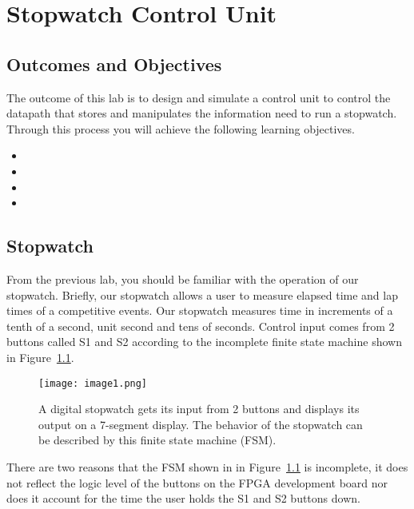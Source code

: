 \chapter{Stopwatch Control Unit}
\label{chapter:stopControl}
\graphicspath{ {./Lab10ControlUnit/Fig} }

\section{Outcomes and Objectives}

The outcome of this lab is to design and simulate 
a control unit to control the datapath that stores and 
manipulates the information need to run a stopwatch.
Through this process you will achieve the following
learning objectives.
\begin{itemize}
	\item {}
	\item {}
	\item {}
	\item {}
\end{itemize}


\section{Stopwatch}

From the previous lab, you should be familiar with the operation of our
stopwatch. Briefly, our stopwatch allows a user to measure elapsed time
and lap times of a competitive events. Our stopwatch measures time in
increments of a tenth of a second, unit second and tens of seconds.
Control input comes from 2 buttons called S1 and S2 according to the
incomplete finite state machine shown in Figure~\ref{fig:swCuHighLevel}.

\begin{figure}[ht]
\texttt{[image: image1.png]}
\caption{ A digital stopwatch gets its input from 2 buttons and displays
its output on a 7-segment display. The behavior of the stopwatch can be
described by this finite state machine (FSM).}
\label{fig:swCuHighLevel}
\end{figure}

There are two reasons that the FSM shown in in Figure~\ref{fig:swCuHighLevel} is incomplete,
it does not reflect the logic level of the buttons on the FPGA development board nor
does it account for the time the user holds the S1 and S2 buttons down.

